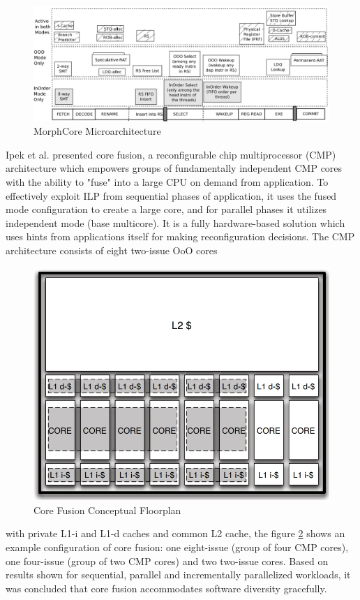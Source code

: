 \documentclass[a4paper,12pt, final]{report}
\begin{document}
\begin{figure}[H]
    \centering
    \includegraphics[width=0.9\linewidth]{morph-uarch.png}
    \caption{MorphCore Microarchitecture}
    \label{morph-arch}
\end{figure}
\indent Ipek et al. \cite{ipek2007core} presented core fusion, a reconfigurable chip multiprocessor (CMP) architecture which empowers groups of fundamentally independent CMP cores with the ability to "fuse" into a large CPU on demand from application. To effectively exploit ILP from sequential phases of application, it uses the fused mode configuration to create a large core, and for parallel phases it utilizes independent mode (base multicore). It is a fully hardware-based solution which uses hints from applications itself for making reconfiguration decisions. The CMP architecture  consists of eight two-issue OoO cores
\begin{figure}[H]
    \centering
    \includegraphics[width=0.4\linewidth]{corefusion-architecture.png}
    \caption{Core Fusion Conceptual Floorplan}
    \label{corefusion-arch}
\end{figure}
\noindent with private L1-i and L1-d caches and common L2 cache, the figure \ref{corefusion-arch} shows an example configuration of core fusion: one eight-issue (group of four CMP cores), one four-issue (group of two CMP cores) and two two-issue cores. Based on results shown for sequential, parallel and incrementally parallelized workloads, it was concluded that core fusion accommodates software diversity gracefully. 
\end{document}

